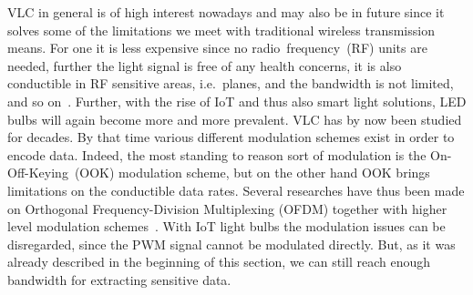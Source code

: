 VLC in general is of high interest nowadays and may also be in future since it solves some of the limitations we meet with traditional wireless transmission means. For one it is less expensive since no radio~frequency~(RF) units are needed, further the light signal is free of any health concerns, it is also conductible in RF sensitive areas, i.e.\ planes, and the bandwidth is not limited, and so on~\cite{Elgala:2007:OVLWCBoWL}. Further, with the rise of IoT and thus also smart light solutions, LED bulbs will again become more and more prevalent.
VLC has by now been studied for decades. By that time various different modulation schemes exist in order to encode data. Indeed, the most standing to reason sort of modulation is the On-Off-Keying~(OOK) modulation scheme, but on the other hand OOK brings limitations on the conductible data rates. Several researches have thus been made on Orthogonal Frequency-Division Multiplexing (OFDM) together with higher level modulation schemes~\cite{Elgala:2007:OVLWCBoWL,Yu:2014:BCDRCVLOS}. With IoT light bulbs the modulation issues can be disregarded, since the PWM signal cannot be modulated directly. But, as it was already described in the beginning of this section, we can still reach enough bandwidth for extracting sensitive data. 